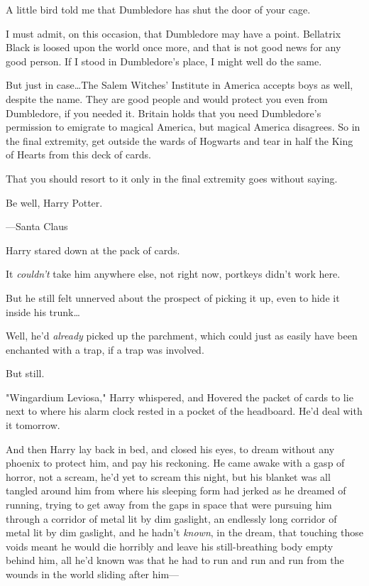 \begin{writtenNote}
A little bird told me that Dumbledore has shut the door of your cage.

I must admit, on this occasion, that Dumbledore may have a point.
Bellatrix Black is loosed upon the world once more, and that is not good news
for any good person. If I stood in Dumbledore's place, I might well do the
same.

But just in case…The Salem Witches' Institute in America accepts
boys as well, despite the name. They are good people and would protect you even
from Dumbledore, if you needed it. Britain holds that you need Dumbledore's
permission to emigrate to magical America, but magical America disagrees. So in
the final extremity, get outside the wards of Hogwarts and tear in half the
King of Hearts from this deck of cards.

That you should resort to it only in the final extremity goes without
saying.

Be well, Harry Potter.

—Santa Claus
\end{writtenNote}

Harry stared down at the pack of cards.

It \emph{couldn't} take him anywhere else, not right now, portkeys didn't work
here.

But he still felt unnerved about the prospect of picking it up, even to hide it
inside his trunk…

Well, he'd \emph{already} picked up the parchment, which could just as easily
have been enchanted with a trap, if a trap was involved.

But still.

"Wingardium Leviosa," Harry whispered, and Hovered the packet of cards to lie
next to where his alarm clock rested in a pocket of the headboard. He'd deal
with it tomorrow.

And then Harry lay back in bed, and closed his eyes, to dream without any
phoenix to protect him, and pay his reckoning.
\later
He came awake with a gasp of horror, not a scream, he'd yet to scream this
night, but his blanket was all tangled around him from where his sleeping form
had jerked as he dreamed of running, trying to get away from the gaps in space
that were pursuing him through a corridor of metal lit by dim gaslight, an
endlessly long corridor of metal lit by dim gaslight, and he hadn't
\emph{known}, in the dream, that touching those voids meant he would die
horribly and leave his still-breathing body empty behind him, all he'd known
was that he had to run and run and run from the wounds in the world sliding
after him—

